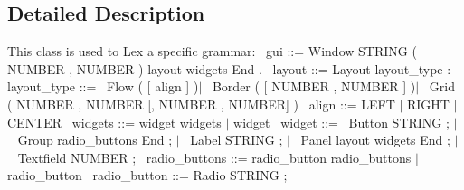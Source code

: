 \subsection{Detailed Description}
This class is used to Lex a specific grammar\+:~\newline
 gui \+:\+:= Window S\+T\+R\+I\+NG \textquotesingle{}(\textquotesingle{} N\+U\+M\+B\+ER \textquotesingle{},\textquotesingle{} N\+U\+M\+B\+ER \textquotesingle{})\textquotesingle{} layout widgets End \textquotesingle{}.\textquotesingle{}~\newline
 layout \+:\+:= Layout layout\+\_\+type \textquotesingle{}\+:\textquotesingle{}~\newline
 layout\+\_\+type \+:\+:=~\newline
 Flow \textquotesingle{}(\textquotesingle{} \mbox{[} align \mbox{]} \textquotesingle{})\textquotesingle{}$\vert$~\newline
 Border \textquotesingle{}(\textquotesingle{} \mbox{[} N\+U\+M\+B\+ER \textquotesingle{},\textquotesingle{} N\+U\+M\+B\+ER \mbox{]} \textquotesingle{})\textquotesingle{}$\vert$~\newline
 Grid \textquotesingle{}(\textquotesingle{} N\+U\+M\+B\+ER \textquotesingle{},\textquotesingle{} N\+U\+M\+B\+ER \mbox{[}\textquotesingle{},\textquotesingle{} N\+U\+M\+B\+ER \textquotesingle{},\textquotesingle{} N\+U\+M\+B\+ER\mbox{]} \textquotesingle{})\textquotesingle{}~\newline
 align \+:\+:= L\+E\+FT $\vert$ R\+I\+G\+HT $\vert$ C\+E\+N\+T\+ER~\newline
 widgets \+:\+:= widget widgets $\vert$ widget~\newline
 widget \+:\+:=~\newline
 Button S\+T\+R\+I\+NG \textquotesingle{};\textquotesingle{} $\vert$~\newline
 Group radio\+\_\+buttons End \textquotesingle{};\textquotesingle{} $\vert$~\newline
 Label S\+T\+R\+I\+NG \textquotesingle{};\textquotesingle{} $\vert$~\newline
 Panel layout widgets End \textquotesingle{};\textquotesingle{} $\vert$~\newline
 Textfield N\+U\+M\+B\+ER \textquotesingle{};\textquotesingle{}~\newline
 radio\+\_\+buttons \+:\+:= radio\+\_\+button radio\+\_\+buttons $\vert$ radio\+\_\+button~\newline
 radio\+\_\+button \+:\+:= Radio S\+T\+R\+I\+NG \textquotesingle{};\textquotesingle{}~\newline


